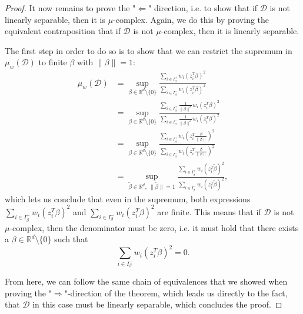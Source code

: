 \begin{proof}
    It now remains to prove the "$\Leftarrow$" direction, i.e. to
    show that if $\mathcal{D}$ is not linearly separable,
    then it is $\mu$-complex. Again, we do this by proving the
    equivalent contraposition that if $\mathcal{D}$ is not
    $\mu$-complex, then it is linearly separable.

    The first step in order to do so is to show that we can restrict the
    supremum in $\mu_w(\mathcal{D})$ to finite $\beta$ with
    $\lVert \beta \rVert = 1$:
    \begin{align*}
        \mu_w(\mathcal{D}) & = \sup_{\beta \in \mathbb{R}^d \setminus \{0\}}
        \frac{\sum_{i \in I_\beta^+} w_i (z_i^T \beta)^2}
        {\sum_{i \in I_\beta^-} w_i (z_i^T \beta)^2}                                         \\ & =
        \sup_{\beta \in \mathbb{R}^d \setminus \{0\}}
        \frac{\sum_{i \in I_\beta^+} \frac{1}{\lVert \beta \rVert^2}w_i (z_i^T \beta)^2}
        {\sum_{i \in I_\beta^-} \frac{1}{\lVert \beta \rVert^2} w_i (z_i^T \beta)^2}         \\
                           & =
        \sup_{\beta \in \mathbb{R}^d \setminus \{0\}}
        \frac{\sum_{i \in I_\beta^+} w_i \left(z_i^T \frac{\beta}{\lVert \beta \rVert}\right)^2}
        {\sum_{i \in I_\beta^-}  w_i \left(z_i^T \frac{\beta}{\lVert \beta \rVert}\right)^2} \\
                           & =
        \sup_{\tilde\beta \in \mathbb{R}^d,\ \lVert \tilde\beta \rVert = 1}
        \frac{\sum_{i \in I_\beta^+} w_i \left(z_i^T \tilde\beta \right)^2}
        {\sum_{i \in I_\beta^-}  w_i \left(z_i^T \tilde\beta \right)^2},
    \end{align*}
    which lets us conclude that even in the supremum, both expressions
    $\sum_{i \in I_\beta^+} w_i (z_i^T \beta )^2$
    and
    $\sum_{i \in I_\beta^-}  w_i (z_i^T \beta )^2$
    are finite.
    This means that if $\mathcal{D}$ is not $\mu$-complex, then
    the denominator must be zero, i.e. it must hold that there exists
    a $\beta \in \mathbb{R}^d \setminus \{0\}$ such that
    \begin{equation*}
        \sum_{i \in I_\beta^-}  w_i (z_i^T \beta )^2 = 0.
    \end{equation*}

    From here, we can follow the same chain of equivalences that we
    showed when proving the "$\Rightarrow$"-direction of the theorem,
    which leads us directly to the fact, that $\mathcal{D}$ in this case must
    be linearly separable, which concludes the proof.
\end{proof}

